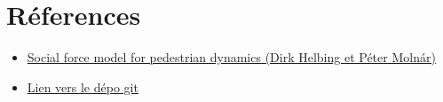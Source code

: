 \documentclass[a4paper,12pt]{article}
\begin{document}
\newpage


\section{Réferences}


\vspace{1em}

\begin{itemize}
	\item \href{https://journals.aps.org/pre/abstract/10.1103/PhysRevE.51.4282}{Social force model for pedestrian dynamics (Dirk Helbing et Péter Molnár)}
	\item \href{https://github.com/antoninnad/etude_des_foules}{Lien vers le dépo git}
\end{itemize}
\end{document}
